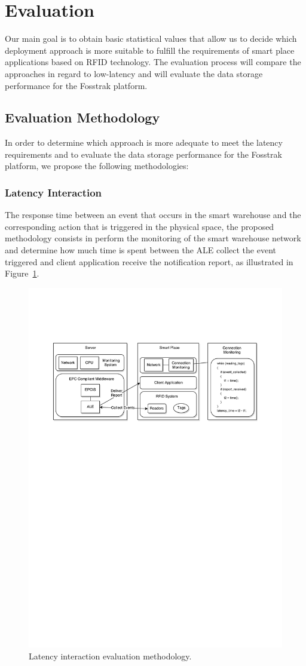 
\section{Evaluation}
\label{sec:evaluation}
Our main goal is to obtain basic statistical values that allow us to decide which deployment
approach is more suitable to fulfill the requirements of smart place applications based on \gls{RFID}
technology. The evaluation process will compare the approaches in regard to low-latency and will
evaluate the data storage performance for the Fosstrak platform.

\subsection{Evaluation Methodology}
\label{sub:eval_methodology}
In order to determine which approach is more adequate to meet the latency requirements and to
evaluate the data storage performance for the Fosstrak platform, we propose the following
methodologies:

\subsubsection{Latency Interaction}
\label{sub:eval_methodology_latency}
The response time between an event that occurs in the smart warehouse and the corresponding action
that is triggered in the physical space, the proposed methodology consists in perform the monitoring
of the smart warehouse network and determine how much time is spent between the \gls{ALE} collect the
event triggered and client application receive the notification report, as illustrated in
Figure~\ref{fig:eval_latency_methodology}.

\begin{figure}[ht!]
  \centering
  \includegraphics[width=.5\textwidth]{./figures/eval_latency_methodology}
  \caption[Latency evaluation methodology.]{Latency interaction evaluation methodology.}
  \label{fig:eval_latency_methodology}
\end{figure}


